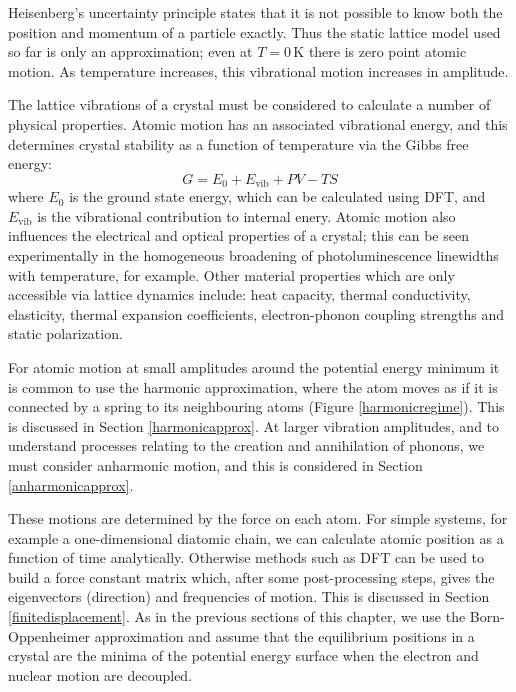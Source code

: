 Heisenberg's uncertainty principle states that it is not possible to know both the position and momentum of a particle exactly. Thus the static lattice model used so far is only an approximation; even at $T=0\,\textrm{K}$ there is zero point atomic motion. As temperature increases, this vibrational motion increases in amplitude.

The lattice vibrations of a crystal must be considered to calculate a number of physical properties. Atomic motion has an associated vibrational energy, and this determines crystal stability as a function of temperature via the Gibbs free energy:
\begin{equation}
G = E_0+E_\textrm{vib}+PV-TS
\end{equation}
where $E_0$ is the ground state energy, which can be calculated using DFT, and $E_\textrm{vib}$ is the vibrational contribution to internal enery.
Atomic motion also influences the electrical and optical properties of a crystal; this can be seen experimentally in the homogeneous broadening of photoluminescence linewidths with temperature, for example.\autocite{silsbee1962}%
Other material properties which are only accessible via lattice dynamics include: heat capacity, thermal conductivity, elasticity, thermal expansion coefficients, electron-phonon coupling strengths and static polarization.

For atomic motion at small amplitudes around the potential energy minimum it is common to use the harmonic approximation, where the atom moves as if it is connected by a spring to its neighbouring atoms (Figure \ref{harmonicregime}). This is discussed in Section \ref{harmonicapprox}. At larger vibration amplitudes, and to understand processes relating to the creation and annihilation of phonons, we must consider anharmonic motion, and this is considered in Section \ref{anharmonicapprox}.

These motions are determined by the force on each atom. For simple systems, for example a one-dimensional diatomic chain, we can calculate atomic position as a function of time analytically. Otherwise methods such as DFT can be used to build a force constant matrix which, after some post-processing steps, gives the eigenvectors (direction) and frequencies of motion. This is discussed in Section \ref{finitedisplacement}. As in the previous sections of this chapter, we use the Born-Oppenheimer approximation and assume that the equilibrium positions in a crystal are the minima of the potential energy surface when the electron and nuclear motion are decoupled.

